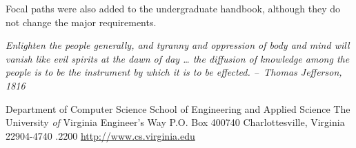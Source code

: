 \documentclass[10pt,letter]{book}
\begin{document}
Focal paths were also added to the undergraduate handbook, although
they do not change the major requirements.

\cleardoublepage
\pagestyle{empty}

\vspace*{2in}

\begin{center}
\parbox{2.5in}{{\em Enlighten the people generally, and tyranny and
    oppression of body and mind will vanish like evil spirits at the
    dawn of day … the diffusion of knowledge among the people is to be
    the instrument by which it is to be effected.\linebreak\linebreak
    --~Thomas Jefferson, 1816}}
\end{center}


\clearpage

\vspace*{2.75in}

\begin{center}
Department of Computer Science \linebreak
School of Engineering and Applied Science \linebreak
The University {\em of} Virginia  Engineer's Way \linebreak
P.O. Box 400740 \linebreak
Charlottesville, Virginia 22904-4740 .2200 \linebreak
\url{http://www.cs.virginia.edu} \linebreak
\end{center}

\begin{figure}[h!]
\begin{center}
\end{center}
\end{figure}
\end{document}
